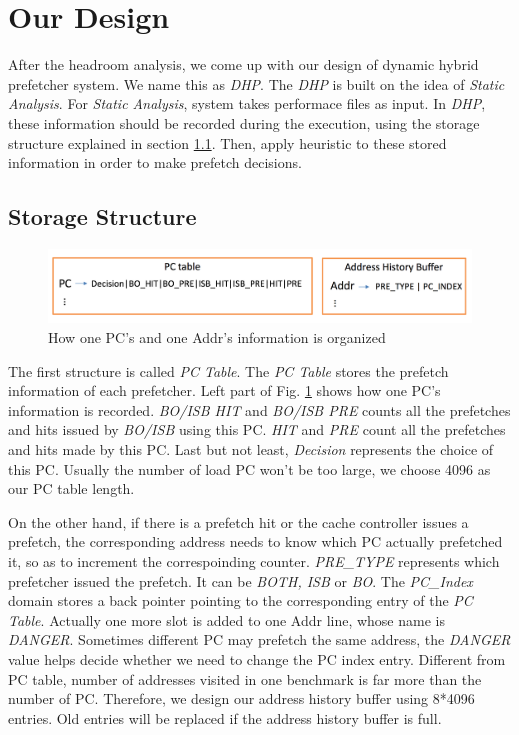 \section{Our Design}
\label{sec:ourdesign}

After the headroom analysis, we come up with our design of dynamic hybrid prefetcher system. We name this as \emph{DHP}. The \emph{DHP} is built on the idea of \emph{Static Analysis}. For \emph{Static Analysis}, system takes performace files as input. In \emph{DHP}, these information should be recorded during the execution, using the storage structure explained in section \ref{sec:storestruct}. Then, apply heuristic to these stored information in order to make prefetch decisions.

  \subsection{Storage Structure}
  \label{sec:storestruct}
  \begin{figure}[ht!]
	   \centering
	   \includegraphics[width=1.0\textwidth]{images/storage_struct.png}
	   \caption{How one PC's and one Addr's information is organized}
	   \label{fig:storage_struct}
  \end{figure}

  The first structure is called \emph{PC Table}. The \emph{PC Table} stores the prefetch information of each prefetcher. Left part of Fig. \ref{fig:storage_struct} shows how one PC's information is recorded. \emph{BO/ISB HIT} and \emph{BO/ISB PRE} counts all the prefetches and hits issued by \emph{BO/ISB} using this PC. \emph{HIT} and \emph{PRE} count all the prefetches and hits made by this PC. Last but not least, \emph{Decision} represents the choice of this PC. Usually the number of load PC won't be too large, we choose 4096 as our PC table length.

  On the other hand, if there is a prefetch hit or the cache controller issues a prefetch, the corresponding address needs to know which PC actually prefetched it, so as to increment the correspoinding counter. \emph{PRE\_TYPE} represents which prefetcher issued the prefetch. It can be \emph{BOTH, ISB} or \emph{BO}. The \emph{PC\_Index} domain stores a back pointer pointing to the corresponding entry of the \emph{PC Table}. Actually one more slot is added to one Addr line, whose name is \emph{DANGER}. Sometimes different PC may prefetch the same address, the \emph{DANGER} value helps decide whether we need to change the PC index entry. Different from PC table, number of addresses visited in one benchmark is far more than the number of PC. Therefore, we design our address history buffer using 8*4096 entries. Old entries will be replaced if the address history buffer is full.

